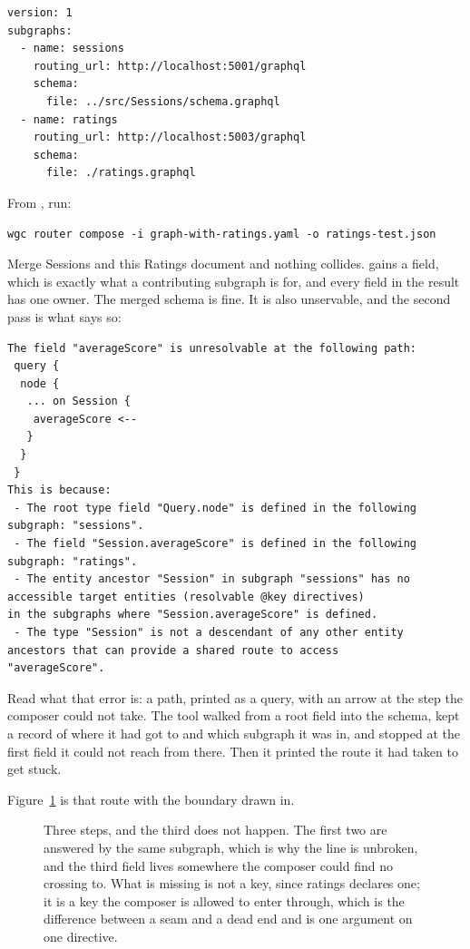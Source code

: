\begin{verbatim}
version: 1
subgraphs:
  - name: sessions
    routing_url: http://localhost:5001/graphql
    schema:
      file: ../src/Sessions/schema.graphql
  - name: ratings
    routing_url: http://localhost:5003/graphql
    schema:
      file: ./ratings.graphql
\end{verbatim}

From , run:

\begin{verbatim}
wgc router compose -i graph-with-ratings.yaml -o ratings-test.json
\end{verbatim}

Merge Sessions and this Ratings document and nothing collides.
 gains a field,
which is exactly what a contributing subgraph is for, and every field in the
result has one owner. The merged schema is fine. It is also unservable, and the
second pass is what says so:

\begin{verbatim}
The field "averageScore" is unresolvable at the following path:
 query {
  node {
   ... on Session {
    averageScore <--
   }
  }
 }
This is because:
 - The root type field "Query.node" is defined in the following subgraph: "sessions".
 - The field "Session.averageScore" is defined in the following subgraph: "ratings".
 - The entity ancestor "Session" in subgraph "sessions" has no accessible target entities (resolvable @key directives)
in the subgraphs where "Session.averageScore" is defined.
 - The type "Session" is not a descendant of any other entity ancestors that can provide a shared route to access
"averageScore".
\end{verbatim}

%
Read what that error is: a path, printed as a query, with an arrow at the step
the composer could not take. The tool walked from a root field into the schema, kept a record of where
it had got to and which subgraph it was in, and stopped at the first field it
could not reach from there. Then it printed the route it had taken to get
stuck.

%
Figure~\ref{fig:ch07-the-walk} is that route with the boundary drawn in.

\begin{figure}
  \centering
  
  \caption{Three steps, and the third does not happen. The first two are
  answered by the same subgraph, which is why the line is unbroken, and the
  third field lives somewhere the composer could find no crossing to. What is
  missing is not a key, since ratings declares one; it is a key the composer is
  allowed to enter through, which is the difference between a seam and a dead
  end and is one argument on one directive.}
  \label{fig:ch07-the-walk}
\end{figure}


